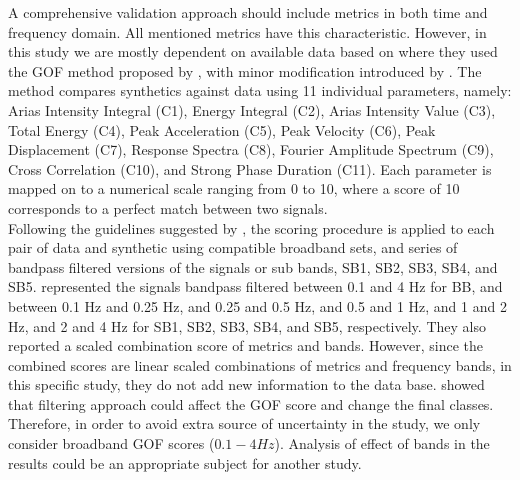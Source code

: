 A comprehensive validation approach should include metrics in both time and frequency domain. All mentioned metrics \citep[i.e.,][]{Anderson_2004_Proc,Kristekova_2006_BSSA,Kristekova_2009_GJI,Olsen_2010_SRL} have this characteristic. However, in this study we are mostly dependent on available data based on \citet{Taborda_2014_BSSA} where they used the GOF method proposed by \citet{Anderson_2004_Proc}, with minor modification introduced by \citet{Taborda_2013_BSSA}. The method compares synthetics against data using 11 individual parameters, namely: Arias Intensity Integral (C1), Energy Integral (C2), Arias Intensity Value (C3), Total Energy (C4), Peak Acceleration (C5), Peak Velocity (C6), Peak Displacement (C7), Response Spectra (C8), Fourier Amplitude Spectrum (C9), Cross Correlation (C10), and Strong Phase Duration (C11). Each parameter is mapped on to a numerical scale ranging from 0 to 10, where a score of 10 corresponds to a perfect  match between two signals.\\
Following the guidelines suggested by \citet{Anderson_2004_Proc}, the scoring procedure is applied to each pair of data and synthetic using compatible broadband sets, and series of bandpass filtered versions of the signals or sub bands, SB1, SB2, SB3, SB4, and SB5. \citet{Taborda_2014_BSSA} represented the signals bandpass filtered between 0.1 and 4 Hz for BB, and between 0.1 Hz and 0.25 Hz, and 0.25 and 0.5 Hz, and 0.5 and 1 Hz, and 1 and 2 Hz, and 2 and 4 Hz for SB1, SB2, SB3, SB4, and SB5, respectively. They also reported a scaled combination score of metrics and bands. However, since the combined scores are linear scaled combinations of metrics and frequency bands, in this specific study, they do not add new information to the data base.  \citet{Khoshnevis_2015_Proc} showed that filtering approach could affect the GOF score and change the final classes. Therefore, in order to avoid extra source of uncertainty in the study, we only consider broadband GOF scores ($0.1-4 Hz$). Analysis of effect of bands in the results could be an appropriate subject for another study. 











